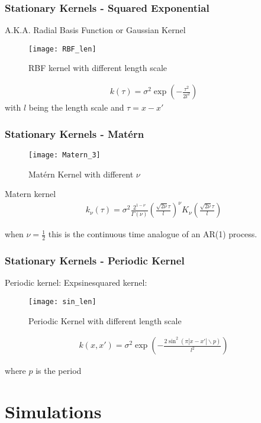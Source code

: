 \documentclass[
	8pt, %
]{beamer}
\begin{document}
\begin{frame}
	\frametitle{Stationary Kernels - Squared Exponential}

	A.K.A. Radial Basis Function or Gaussian Kernel

	\begin{figure}
			\texttt{[image: RBF\_len]}
			\caption{RBF kernel with different length scale}
	\end{figure}

	\begin{gather*}
    k(\tau) = \sigma^2 \exp(-\frac{\tau^2}{2 l^2})
	\end{gather*}
	with $l$ being the length scale and $\tau = x-x'$
\end{frame}

\begin{frame}
	\frametitle{Stationary Kernels - Matérn}


	\begin{figure}
			\texttt{[image: Matern\_3]}
			\caption{Matérn Kernel with different $\nu$}
	\end{figure}

	Matern kernel
	\begin{gather*}
    k_{\nu}(\tau) = \sigma^2 \frac{2^{1-\nu}}{\Gamma(\nu)}(\frac{\sqrt{2\nu} \tau}{l})^{\nu} K_{\nu}
    (\frac{\sqrt{2\nu} \tau}{l})
	\end{gather*}

	when $\nu = \frac{1}{2}$ this is the continuous time analogue of an AR(1) process.

\end{frame}

\begin{frame}
	\frametitle{Stationary Kernels - Periodic Kernel}
	Periodic kernel: Expsinesquared kernel:

	\begin{figure}
			\texttt{[image: sin\_len]}
			\caption{Periodic Kernel with different length scale}
	\end{figure}

	\begin{gather*}
    k(x, x') = \sigma^2 \exp(- \frac{2 \sin^2(\pi |x-x'| \backslash p)}{l^2})
	\end{gather*}

	where $p$ is the period
\end{frame}



\section{Simulations} %
\end{document}
